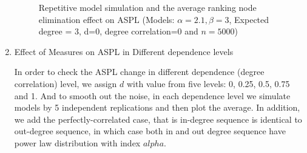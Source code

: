 \documentclass{article}
\begin{document}
\begin{enumerate}
\begin{figure}[!hbtp]
\hfill
{}
\hfill
{}
\hfill
\caption{
\label{repetitions}%
 Repetitive model simulation and the average ranking node elimination effect on ASPL (Models: $\alpha=2.1, \beta=3$, Expected degree = 3, d=0, degree correlation=0 and $n=5000$)}
\end{figure}

\newpage

\item Effect of Measures on ASPL in Different dependence levels\\

\par In order to check the ASPL change in different dependence (degree correlation) level, we assign $d$ with value from five levels: 0, 0.25, 0.5, 0.75 and 1. And to smooth out the noise, in each dependence level we simulate models by 5 independent replications and then plot the average. In addition, we add the perfectly-correlated case, that is in-degree sequence is identical to out-degree sequence, in which case both in and out degree sequence have power law distribution with index $alpha$.


\end{enumerate}
\end{document}
